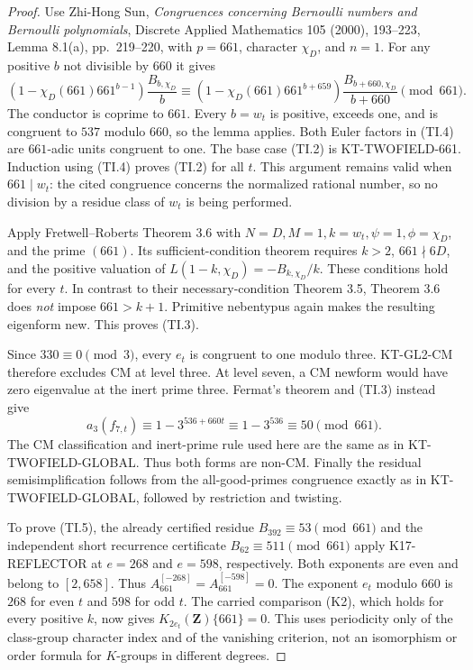 \begin{proof}
Use Zhi-Hong Sun, \emph{Congruences concerning Bernoulli
numbers and Bernoulli polynomials}, Discrete Applied
Mathematics 105 (2000), 193--223, Lemma 8.1(a),
pp.~219--220, with $p=661$, character $\chi_D$, and
$n=1$. For any positive $b$ not divisible by $660$ it gives
\[
 (1-\chi_D(661)661^{b-1})\frac{B_{b,\chi_D}}b
 \equiv
 (1-\chi_D(661)661^{b+659})
           \frac{B_{b+660,\chi_D}}{b+660}
                                  \pmod{661}.
                                                               \tag{TI.4}
\]
The conductor is coprime to $661$. Every $b=w_t$ is
positive, exceeds one, and is congruent to $537$ modulo
$660$, so the lemma applies. Both Euler factors in
(TI.4) are $661$-adic units congruent to one. The base
case (TI.2) is KT-TWOFIELD-661. Induction using (TI.4)
proves (TI.2) for all $t$. This argument remains valid
when $661\mid w_t$: the cited congruence concerns the
normalized rational number, so no division by a residue
class of $w_t$ is being performed.

Apply Fretwell--Roberts Theorem 3.6 with
$N=D,M=1,k=w_t,\psi=1,\phi=\chi_D$, and the prime
$(661)$. Its sufficient-condition theorem requires
$k>2$, $661\nmid6D$, and the positive valuation of
$L(1-k,\chi_D)=-B_{k,\chi_D}/k$. These conditions hold
for every $t$. In contrast to their necessary-condition
Theorem 3.5, Theorem 3.6 does \emph{not} impose
$661>k+1$. Primitive nebentypus again makes the resulting
eigenform new. This proves (TI.3).

Since $330\equiv0\pmod3$, every $e_t$ is congruent to
one modulo three. KT-GL2-CM therefore excludes CM at
level three. At level seven, a CM newform would have
zero eigenvalue at the inert prime three. Fermat's theorem
and (TI.3) instead give
\[
 a_3(f_{7,t})\equiv1-3^{536+660t}
                  \equiv1-3^{536}\equiv50\pmod{661}.
\]
The CM classification and inert-prime rule used here
are the same as in KT-TWOFIELD-GLOBAL. Thus both forms
are non-CM. Finally the residual semisimplification follows
from the all-good-primes congruence exactly as in
KT-TWOFIELD-GLOBAL, followed by restriction and twisting.

To prove (TI.5), the already certified residue
$B_{392}\equiv53\pmod{661}$ and the independent short
recurrence certificate $B_{62}\equiv511\pmod{661}$
apply K17-REFLECTOR at $e=268$ and $e=598$, respectively.
Both exponents are even and belong to $[2,658]$.
Thus $A_{661}^{[-268]}=A_{661}^{[-598]}=0$.
The exponent $e_t$ modulo $660$ is $268$ for even $t$
and $598$ for odd $t$. The carried comparison (K2),
which holds for every positive $k$, now gives
$K_{2e_t}(\mathbf Z)\{661\}=0$. This uses periodicity
only of the class-group character index and of the
vanishing criterion, not an isomorphism or order formula
for $K$-groups in different degrees.
\end{proof}

